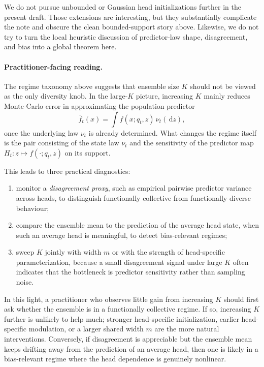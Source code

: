 \documentclass{article}
\theoremstyle{definition}
\newcommand{\dd}{\,\mathrm{d}}
\begin{document}
We do not pursue unbounded or Gaussian head initializations further in the
present draft. Those extensions are interesting, but they substantially
complicate the note and obscure the clean bounded-support story above. Likewise,
we do not try to turn the local heuristic discussion of predictor-law shape,
disagreement, and bias into a global theorem here.

\paragraph{Practitioner-facing reading.}
The regime taxonomy above suggests that ensemble size $K$ should not be viewed
as the only diversity knob. In the large-$K$ picture, increasing $K$ mainly
reduces Monte-Carlo error in approximating the population predictor
\[
  \bar f_t(x)=\int f(x;q_t,z)\,\nu_t(\dd z),
\]
once the underlying law $\nu_t$ is already determined. What changes the regime
itself is the pair consisting of the state law $\nu_t$ and the sensitivity of
the predictor map $H_t:z\mapsto f(\cdot;q_t,z)$ on its support.

This leads to three practical diagnostics:
\begin{enumerate}[leftmargin=2em]
  \item monitor a \emph{disagreement proxy}, such as empirical pairwise
  predictor variance across heads, to distinguish functionally collective from
  functionally diverse behaviour;
  \item compare the ensemble mean to the prediction of the average head state,
  when such an average head is meaningful, to detect bias-relevant regimes;
  \item sweep $K$ jointly with width $m$ or with the strength of head-specific
  parameterization, because a small disagreement signal under large $K$ often
  indicates that the bottleneck is predictor sensitivity rather than sampling
  noise.
\end{enumerate}

In this light, a practitioner who observes little gain from increasing $K$
should first ask whether the ensemble is in a functionally collective regime.
If so, increasing $K$ further is unlikely to help much; stronger head-specific
initialization, earlier head-specific modulation, or a larger shared width $m$
are the more natural interventions. Conversely, if disagreement is appreciable
but the ensemble mean keeps drifting away from the prediction of an average
head, then one is likely in a bias-relevant regime where the head dependence is
genuinely nonlinear.
\end{document}

